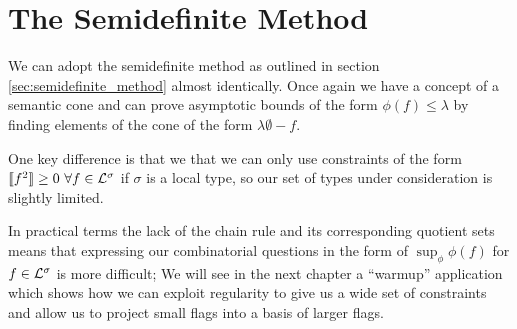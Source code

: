 \section{The Semidefinite Method}

We can adopt the semidefinite method as outlined in section \ref{sec:semidefinite_method}
almost identically. Once again we have a concept of a semantic cone and can prove
asymptotic bounds of the form $\phi(f) \leq \lambda$ by finding elements of the cone of
the form $\lambda\emptyset - f$.

One key difference is that we that we can only use constraints of the form
$\llbracket f^2 \rrbracket \geq 0\ \forall f \in \Lcl^\sigma$ if $\sigma$ is a
local type, so our set of types under consideration is slightly limited.

In practical terms the lack of the chain rule and its corresponding quotient sets means that
expressing our combinatorial questions in the form of $\sup_\phi \phi(f)$ for $f\in\mathcal{L}^\sigma$ is
more difficult; We will see in the next chapter a ``warmup'' application which shows how we can
exploit regularity to give us a wide set of constraints and allow us to project small
flags into a basis of larger flags.
